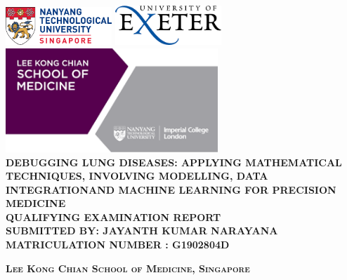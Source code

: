 \begin{titlepage}
\begin{center}

\includegraphics[width=0.3\textwidth]{image/ntu_logo.png} \hfill \includegraphics[width=0.3\textwidth]{image/uoe_logo.png}
\\[2cm]
\includegraphics[width=0.6\textwidth]{image/lkc_logo.png}
\\[4cm]

\uppercase{\textbf{\Large{
Debugging Lung Diseases: Applying mathematical techniques, involving modelling, data integrationand machine learning for precision medicine \\[2cm]
Qualifying Examination Report}}}
\\[2cm]

\uppercase{
\textbf{
Submitted by: Jayanth Kumar Narayana
}
\\
\textbf{
Matriculation Number : G1902804D\\
}}

\vfill

\textsc{\bfseries Lee Kong Chian School of Medicine, Singapore}


\end{center}
\end{titlepage}